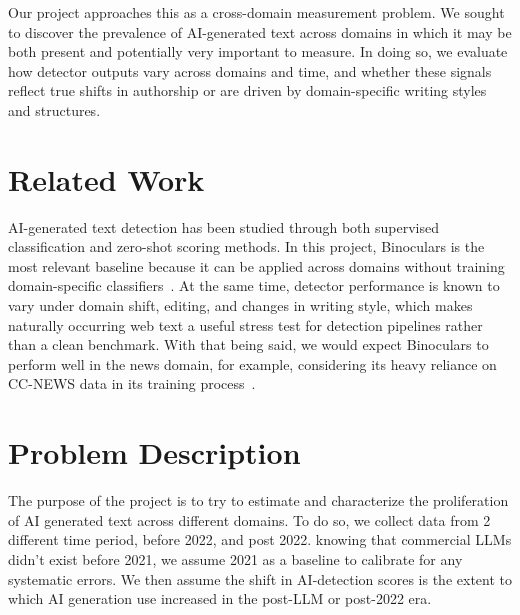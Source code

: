 \documentclass[11pt]{article}
\begin{document}
Our project approaches this as a cross-domain measurement problem. We sought to discover the prevalence of AI-generated text across domains in which it may be both present and potentially very important to measure. In doing so, we evaluate how detector outputs vary across domains and time, and whether these signals reflect true shifts in authorship or are driven by domain-specific writing styles and structures.

\section{Related Work}
\noindent AI-generated text detection has been studied through both supervised
classification and zero-shot scoring methods. In this project, Binoculars is
the most relevant baseline because it can be applied across domains without
training domain-specific classifiers~\citep{hans2024binoculars}. At the same
time, detector performance is known to vary under domain shift, editing, and
changes in writing style, which makes naturally occurring web text a useful
stress test for detection pipelines rather than a clean benchmark. With that being said, we would expect Binoculars to perform well in the news domain, for example, considering its heavy reliance on CC-NEWS data in its training process~\citep{hans2024binoculars}.



\section{Problem Description}
The purpose of the project is to try to estimate and characterize the proliferation of AI generated text across different domains. To do so, we collect data from 2 different time period, before 2022, and post 2022. knowing that commercial LLMs didn't exist before 2021, we assume 2021 as a baseline to calibrate for any systematic errors. We then assume the shift in AI-detection scores is the extent to which AI generation use increased in the post-LLM or post-2022 era. 
\end{document}
